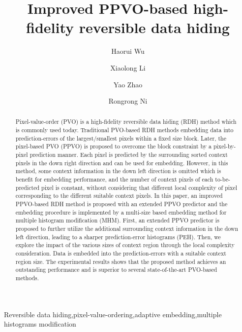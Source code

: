 \documentclass[review,3p,10pt,sort&compress]{elsarticle}
\begin{document}
\begin{frontmatter}

\title {Improved PPVO-based high-fidelity reversible data hiding}

\author{Haorui Wu}

\author{Xiaolong Li}

\author{Yao Zhao}

\author{Rongrong Ni}

\address[mymainaddress]{Institute of Information Science, Beijing Jiaotong University, Beijing 100044, China}
\address[mysecondaryaddress]{Beijing Key Laboratory of Advanced Information Science and Network Technology, Beijing 100044, China}

\begin{abstract}
Pixel-value-order (PVO) is a high-fidelity reversible data hiding (RDH) method which is commonly used today.
Traditional PVO-based RDH methods embedding data into prediction-errors of the largest/smallest pixels within a fixed size block.
Later, the pixel-based PVO (PPVO) is proposed to overcome the block constraint by a pixel-by-pixel prediction manner. Each pixel is predicted by the surrounding sorted context pixels in the down right direction and can be used for embedding. However, in this method, some context information in the down left direction is omitted which is benefit for embedding performance, and the number of context pixels of each to-be-predicted pixel is constant, without considering that different local complexity of pixel corresponding to the different suitable context pixels.
In this paper, an improved PPVO-based RDH method is proposed with an extended PPVO predictor and the embedding procedure is implemented by a multi-size based embedding method for multiple histogram modification (MHM). First, an extended PPVO predictor is proposed to further utilize the additional surrounding context information in the down left direction, leading to a sharper prediction-error histograms (PEH). Then, we explore the impact of the various sizes of context region through the local complexity consideration.
Data is embedded into the prediction-errors with a suitable context region size.
The experimental results shows that the proposed method achieves an outstanding performance and is superior to several state-of-the-art PVO-based methods.
\end{abstract}


\begin{keyword}
   Reversible data hiding\sep pixel-value-ordering\sep adaptive embedding\sep multiple histograms modification
\end{keyword}

\end{frontmatter}
\end{document}
